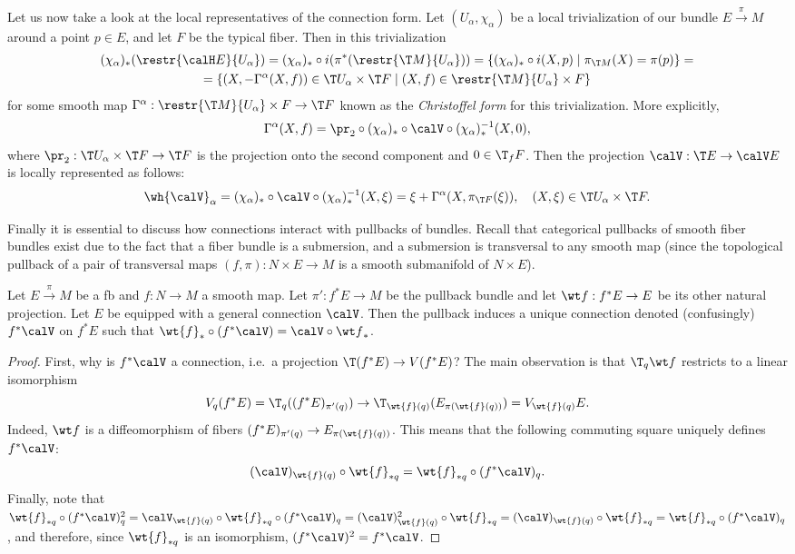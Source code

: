 Let us now take a look at the local representatives of the connection form. Let $(U_\alpha,\chi_\alpha)$ be a local trivialization of our bundle $E\overset{\pi}{\to}M$ around a point $p\in E$, and let $F$ be the typical fiber. Then in this trivialization
\begin{multline}
    (\chi_\alpha)_\ast(\restr{\calH E}{U_\alpha})=(\chi_\alpha)_\ast\circ i(\pi^\ast (\restr{\T M}{U_\alpha}))=\{(\chi_\alpha)_\ast\circ i(X,p)\mid \pi_{\T M}(X)=\pi(p)\}=\\
    =\{(X,-\Gamma^\alpha(X,f))\in \T U_\alpha\times \T F\mid (X,f)\in \restr{\T M}{U_\alpha}\times F\}
\end{multline}
for some smooth map $\Gamma^\alpha:\restr{\T M}{U_\alpha}\times F\to \T F$ known as the \emph{Christoffel form} for this trivialization. More explicitly,
\[\Gamma^\alpha(X,f)=\pr_2\circ (\chi_\alpha)_\ast\circ \calV\circ (\chi_\alpha)_\ast^{-1}(X,0),\]
where $\pr_2:\T U_\alpha\times \T F\to \T F$ is the projection onto the second component and $0 \in \T_fF$. Then the projection $\calV:\T E\to \calV E$ is locally represented as follows:
\[\wh{\calV}_\alpha=(\chi_\alpha)_\ast\circ \calV\circ (\chi_\alpha)_\ast^{-1}(X,\xi)=\xi+\Gamma^\alpha(X,\pi_{\T F}(\xi)),\quad (X,\xi)\in \T U_\alpha\times \T F.\]

Finally it is essential to discuss how connections interact with pullbacks of bundles. Recall that categorical pullbacks of smooth fiber bundles exist due to the fact that a fiber bundle is a submersion, and a submersion is transversal to any smooth map (since the topological pullback of a pair of transversal maps $(f,\pi):N\times E\to M$ is a smooth submanifold of $N\times E$).

\begin{prop}
   Let $E\overset{\pi}{\to}M$ be a \gls{fb} and $f:N\to M$ a smooth map. Let $\pi':f^\ast E\to M$ be the pullback bundle and let $\wt f:f^\ast E\to E$ be its other natural projection. Let $E$ be equipped with a general connection $\calV$. Then the pullback induces a unique connection denoted (confusingly) $f^\ast\calV$ on $f^\ast E$ such that $\wt{f}_\ast\circ (f^\ast \calV)=\calV\circ {\wt f}_\ast$.
\end{prop}
\begin{proof}
    First, why is $f^\ast\calV$ a connection, i.e.\ a projection $\T(f^\ast E)\to V(f^\ast E)$? The main observation is that $\T_q{\wt f}$ restricts to a linear isomorphism 
    \[V_q (f^\ast E)=\T_q((f^\ast E)_{\pi'(q)})\to \T_{\wt{f}(q)}(E_{\pi(\wt{f}(q))})=V_{\wt{f}(q)}E.\]
    Indeed, $\wt f$ is a diffeomorphism of fibers $(f^\ast E)_{\pi'(q)}\to E_{\pi(\wt{f}(q))}$. This means that the following commuting square uniquely defines $f^\ast\calV$:
    \[(\calV)_{\wt{f}(q)}\circ \wt{f}_{\ast q}=\wt{f}_{\ast q}\circ (f^\ast \calV)_q.\]
    Finally, note that $\wt{f}_{\ast q}\circ (f^\ast\calV)^2_q=\calV_{\wt{f}(q)}\circ \wt{f}_{\ast q}\circ (f^\ast\calV)_q=(\calV)^2_{\wt{f}(q)}\circ \wt{f}_{\ast q}=(\calV)_{\wt{f}(q)}\circ \wt{f}_{\ast q}=\wt{f}_{\ast q}\circ (f^\ast \calV)_q$, and therefore, since $\wt{f}_{\ast q}$ is an isomorphism, $(f^\ast\calV)^2=f^\ast\calV$.
\end{proof}


